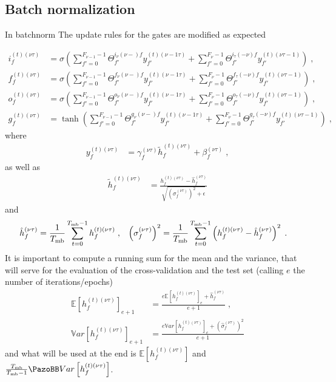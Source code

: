 \subsection{Batch normalization}

In batchnorm The update rules for the gates are modified as expected

\begin{align}
i^{(t)(\nu\tau)}_f&=\sigma\left(\sum_{f'=0}^{F_{{\nu-1}}-1}\Theta^{i_\nu(\nu-)f}_{f'}
%
y^{(t)(\nu-1\tau)}_{f'}+\sum_{f'=0}^{F{_{\nu}}-1}\Theta^{i_\tau(-\nu)f}_{f'}
%
y^{(t)(\nu\tau-1)}_{f'}\right)\;,\\
%
f^{(t)(\nu\tau)}_f&=\sigma\left(\sum_{f'=0}^{F{_{\nu-1}}-1}\Theta^{f_\nu(\nu-)f}_{f'}
%
y^{(t)(\nu-1\tau)}_{f'}+\sum_{f'=0}^{F_{{\nu}}-1}\Theta^{f_\tau(-\nu)f}_{f'}
%
y^{(t)(\nu\tau-1)}_{f'}\right)\;,\\
%
o^{(t)(\nu\tau)}_f&=\sigma\left(\sum_{f'=0}^{F_{{\nu-1}}-1}\Theta^{o_\nu(\nu-)f}_{f'}
%
y^{(t)(\nu-1\tau)}_{f'}+\sum_{f'=0}^{F_{{\nu}}-1}\Theta^{o_\tau(-\nu)f}_{f'}
%
y^{(t)(\nu\tau-1)}_{f'}\right)\;,\\
%
g^{(t)(\nu\tau)}_f&=\tanh\left(\sum_{f'=0}^{F_{{\nu-1}}-1}\Theta^{g_\nu(\nu-)f}_{f'}
%
y^{(t)(\nu-1\tau)}_{f'}+\sum_{f'=0}^{F_{{\nu}}-1}\Theta^{g_\tau(-\nu)f}_{f'}
%
y^{(t)(\nu\tau-1)}_{f'}\right)\;,
\end{align}
where
\begin{align}
y^{(t)(\nu\tau)}_{f}&=\gamma^{(\nu\tau)}_{f}\tilde{h}^{(t)(\nu\tau)}_{f}+\beta^{(\nu\tau)}_{f}\;,
\end{align}
as well as
\begin{align}
\tilde{h}^{(t)(\nu\tau)}_{f}&=\frac{h^{(t)(\nu\tau)}_{f}-
%
\hat{h}^{(\nu\tau)}_{f}}{\sqrt{\left(\sigma^{(\nu\tau)}_{f}\right)^2+\epsilon}}
\end{align}
and
\begin{align}
\hat{h}^{(\nu\tau)}_{f}&=\frac{1}{T_{{\rm mb}}}\sum_{t=0}^{T_{{\rm mb}}-1}h^{(t)(\nu\tau)}_{f}\;,&
%
\left(\sigma^{(\nu\tau)}_{f}\right)^2&=\frac{1}{T_{{\rm mb}}}\sum_{t=0}^{T_{{\rm mb}}-1}\left(h^{(t)(\nu\tau)}_{f}
%
-\hat{h}^{(\nu\tau)}_{f}\right)^2\;.
\end{align}
It is important to compute a running sum for the mean and the variance, that will serve for the evaluation of the cross-validation and the test set (calling $e$ the number of iterations/epochs)
\begin{align}
\mathbb{E}\left[h_{f}^{(t)(\nu\tau)}\right]_{e+1} &=
%
\frac{e\mathbb{E}\left[h_{f}^{(t)(\nu\tau)}\right]_{e}+\hat{h}_{f}^{(\nu\tau)}}{e+1}\;,\\
%
\mathbb{V}ar\left[h_{f}^{(t)(\nu\tau)}\right]_{e+1} &=
%
\frac{e\mathbb{V}ar\left[h_{f}^{(t)(\nu\tau)}\right]_{e}+\left(\hat{\sigma}_{f}^{(\nu\tau)}\right)^2}{e+1}
\end{align}
and what will be used at the end is $\mathbb{E}\left[h_{f}^{(t)(\nu\tau)}\right]$ and $\frac{T_{{\rm mb}}}{T_{{\rm mb}}-1}\mathbb{V}ar\left[h_{f}^{(t)(\nu\tau)}\right]$.




